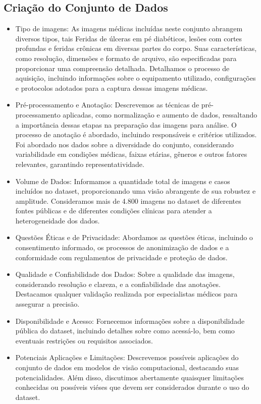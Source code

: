 \subsection{Criação do Conjunto de Dados}
    
    \begin{itemize}
        \item Tipo de imagens: As imagens médicas incluídas neste conjunto abrangem diversos tipos, tais Feridas de úlceras em pé diabéticos, lesões com cortes profundas e feridas crônicas em diversas partes do corpo. Suas características, como resolução, dimensões e formato de arquivo, são especificadas para proporcionar uma compreensão detalhada. Detalhamos o processo de aquisição, incluindo informações sobre o equipamento utilizado, configurações e protocolos adotados para a captura dessas imagens médicas.
    
        \item Pré-processamento e Anotação: Descrevemos as técnicas de pré-processamento aplicadas, como normalização e aumento de dados, ressaltando a importância dessas etapas na preparação das imagens para análise. O processo de anotação é abordado, incluindo responsáveis e critérios utilizados. Foi abordado nos dados sobre a diversidade do conjunto, considerando variabilidade em condições médicas, faixas etárias, gêneros e outros fatores relevantes, garantindo representatividade.
    
        \item Volume de Dados: Informamos a quantidade total de imagens e casos incluídos no dataset, proporcionando uma visão abrangente de sua robustez e amplitude. Consideramos mais de 4.800 imagens no dataset de diferentes fontes públicas e de diferentes condições clínicas para atender a heterogeneidade dos dados.
    
        \item Questões Éticas e de Privacidade: Abordamos as questões éticas, incluindo o consentimento informado, os processos de anonimização de dados e a conformidade com regulamentos de privacidade e proteção de dados.

        \item Qualidade e Confiabilidade dos Dados: Sobre a qualidade das imagens, considerando resolução e clareza, e a confiabilidade das anotações. Destacamos qualquer validação realizada por especialistas médicos para assegurar a precisão.

        \item Disponibilidade e Acesso: Fornecemos informações sobre a disponibilidade pública do dataset, incluindo detalhes sobre como acessá-lo, bem como eventuais restrições ou requisitos associados.

        \item Potenciais Aplicações e Limitações: Descrevemos possíveis aplicações do conjunto de dados em modelos de visão computacional, destacando suas potencialidades. Além disso, discutimos abertamente quaisquer limitações conhecidas ou possíveis viéses que devem ser considerados durante o uso do dataset.

        
    \end{itemize}

